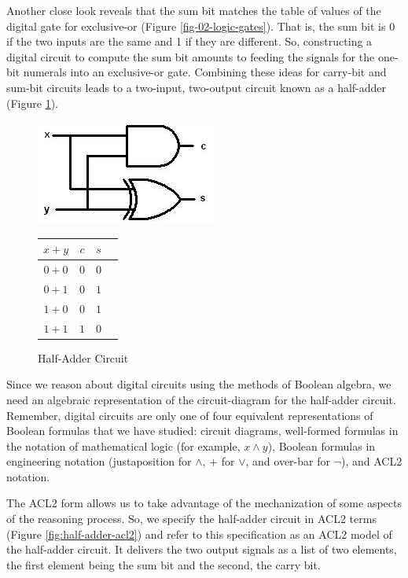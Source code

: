 Another close look reveals that the sum bit
matches the table of values of the
digital gate for exclusive-or (Figure \ref{fig-02-logic-gates}).
That is, the sum bit is 0 if the two inputs are the same
and 1 if they are different.
So, constructing a digital circuit to compute the sum bit
amounts to feeding the signals for the one-bit numerals
into an exclusive-or gate.
Combining these ideas for carry-bit and sum-bit circuits
leads to a two-input, two-output circuit known as a
half-adder (Figure \ref{fig:half-adder}).

\begin{figure}
\begin{center}
\includegraphics[scale=0.7]{Images/half-adder.png}
\begin{tabular}{|c|c|c|c}
 \hline
 $x+y$  & $c$ & $s$ \\
 \hline
 $0+0$  & $0$ & $0$ \\
 \hline
 $0+1$  & $0$ & $1$ \\
 \hline
 $1+0$  & $0$ & $1$ \\
 \hline
 $1+1$  & $1$ & $0$ \\
 \hline
\end{tabular}
\end{center}
\caption{Half-Adder Circuit}
\label{fig:half-adder}
\end{figure}

Since we reason about digital circuits using the methods
of Boolean algebra, we need an algebraic representation
of the circuit-diagram for the half-adder circuit.
Remember, digital circuits are only one of four
equivalent representations of Boolean formulas that
we have studied: circuit diagrams, well-formed formulas
in the notation of mathematical logic (for example, $x \wedge y$),
Boolean formulas in engineering notation (justaposition for $\wedge$,
$+$ for $\vee$, and over-bar for $\neg$), and ACL2 notation.

The ACL2 form allows us to take advantage
of the mechanization of some aspects of the reasoning process.
So, we specify the half-adder circuit in ACL2 terms
(Figure \ref{fig:half-adder-acl2})
and refer to this specification as an
ACL2 model of the half-adder circuit.
It delivers the two output signals as a list of two elements,
the first element being the sum bit and the second, the carry bit.


